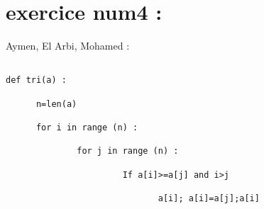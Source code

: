 \documentclass{article}
\begin{document}
\section{exercice num4 :}
	\begin{center}
    		Aymen, El Arbi, Mohamed :
	\end{center}
	\begin{verbatim}
	
def tri(a) :

      n=len(a)

      for i in range (n) :

              for j in range (n) :

                       If a[i]>=a[j] and i>j

                              a[i]; a[i]=a[j];a[i]
	\end{verbatim}
\end{document}
